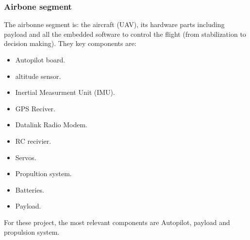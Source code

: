 \subsubsection{Airbone segment}
The airbonne segment is: the aircraft (UAV), its hardware parts including payload and all the embedded software to control the flight (from stabilization to decision making). They key components are:
\begin{itemize}
    \item Autopilot board.
    \item altitude sensor.
    \item Inertial Measurment Unit (IMU).
    \item GPS Reciver.
    \item Datalink Radio Modem.
    \item RC recivier.
    \item Servos.
    \item Propultion system.
    \item Batteries.
    \item Payload.
\end{itemize}
For these project, the most relevant components are Autopilot, payload and propulsion system.

